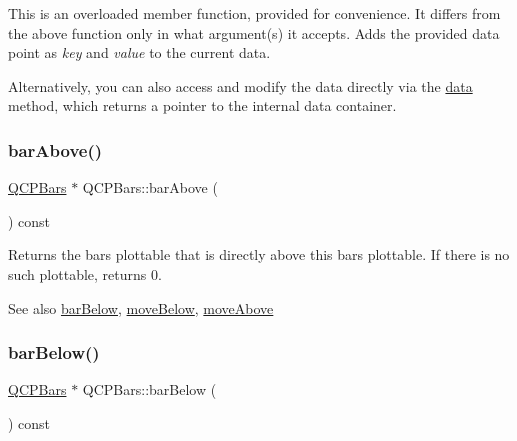 This is an overloaded member function, provided for convenience. It differs from the above function only in what argument(s) it accepts. Adds the provided data point as {\itshape key} and {\itshape value} to the current data.

Alternatively, you can also access and modify the data directly via the \mbox{\hyperlink{class_q_c_p_bars_a7e373a534d82e18ed27b3fafd1f08fae}{data}} method, which returns a pointer to the internal data container. \mbox{\label{class_q_c_p_bars_ab97f2acd9f6cb40d2cc3c33d278f0e78}} 
\subsubsection{\texorpdfstring{barAbove()}{barAbove()}}
{\footnotesize\ttfamily \mbox{\hyperlink{class_q_c_p_bars}{Q\+C\+P\+Bars}} $\ast$ Q\+C\+P\+Bars\+::bar\+Above (\begin{DoxyParamCaption}{ }\end{DoxyParamCaption}) const\hspace{0.3cm}{\ttfamily [inline]}}

Returns the bars plottable that is directly above this bars plottable. If there is no such plottable, returns 0.

\begin{DoxySeeAlso}{See also}
\mbox{\hyperlink{class_q_c_p_bars_a1b58664864b141f45e02044a855b3213}{bar\+Below}}, \mbox{\hyperlink{class_q_c_p_bars_a69fc371346980f19177c3d1ecdad78ee}{move\+Below}}, \mbox{\hyperlink{class_q_c_p_bars_ac22e00a6a41509538c21b04f0a57318c}{move\+Above}} 
\end{DoxySeeAlso}
\mbox{\label{class_q_c_p_bars_a1b58664864b141f45e02044a855b3213}} 
\subsubsection{\texorpdfstring{barBelow()}{barBelow()}}
{\footnotesize\ttfamily \mbox{\hyperlink{class_q_c_p_bars}{Q\+C\+P\+Bars}} $\ast$ Q\+C\+P\+Bars\+::bar\+Below (\begin{DoxyParamCaption}{ }\end{DoxyParamCaption}) const\hspace{0.3cm}{\ttfamily [inline]}}


